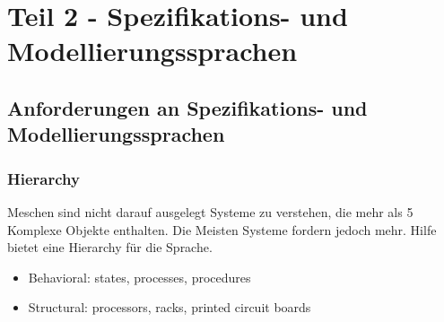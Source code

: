 \section{Teil 2 - Spezifikations- und Modellierungssprachen}

\subsection{Anforderungen an Spezifikations- und Modellierungssprachen}

\subsubsection{Hierarchy}

Meschen sind nicht darauf ausgelegt Systeme zu verstehen, die mehr als 5 Komplexe Objekte enthalten.
Die Meisten Systeme fordern jedoch mehr.
Hilfe bietet eine Hierarchy für die Sprache.

\begin{itemize}
    \item Behavioral: states, processes, procedures
    \item Structural: processors, racks, printed circuit boards
\end{itemize}
